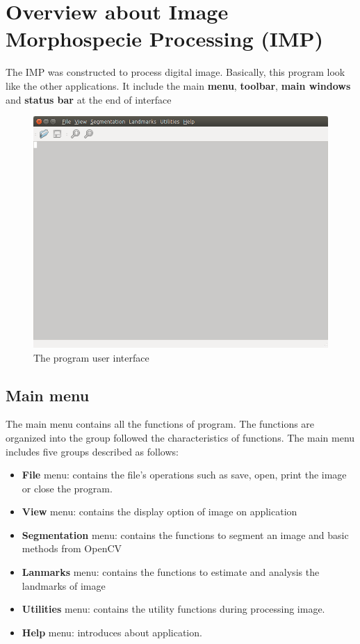 \section{Overview about Image Morphospecie Processing (IMP)}
The IMP was constructed to process digital image. Basically, this program look like the other applications. It include the main \textbf{menu}, \textbf{toolbar}, \textbf{main windows} and \textbf{status bar} at the end of interface
\begin{figure}[h!]
\centering
\includegraphics[scale=0.4]{images/main}
\caption{The program user interface}
\label{fig:figure_31}
\end{figure}
\subsection{Main menu}
The main menu contains all the functions of program. The functions are organized into the group followed the characteristics of functions. The main menu includes five groups described as follows:
\begin{itemize}
	\item \textbf{File} menu: contains the file's operations such as save, open, print the image or close the program.
	\item \textbf{View} menu: contains the display option of image on application 
	\item \textbf{Segmentation} menu: contains the functions to segment an image and basic methods from OpenCV
	\item \textbf{Lanmarks} menu: contains the functions to estimate and analysis the landmarks of image
	\item \textbf{Utilities} menu: contains the utility functions during processing image.
	\item \textbf{Help} menu: introduces about application.
\end{itemize}
